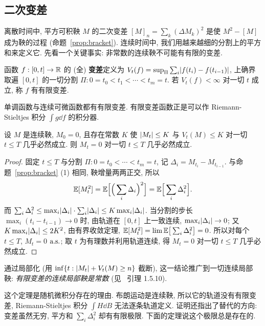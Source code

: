 \subsection{二次变差}

离散时间中, 平方可积鞅 $M$ 的二次变差 $[M]_n=\sum_k(\Delta M_k)^2$ 是使 $M^2-[M]$ 成为鞅的过程 (命题~\ref{prop:bracket}). 连续时间中, 我们用越来越细的分割上的平方和来定义它. 先看一个关键事实: 非常数的连续鞅不可能有有限的变差.

\begin{definition}[变差]
函数 $f:[0,t]\to\mathbb{R}$ 的 (全) \textbf{变差}定义为 $V_t(f)=\sup_\Pi\sum_i\lvert f(t_i)-f(t_{i-1})\rvert$, 上确界取遍 $[0,t]$ 的一切分割 $\Pi: 0=t_0<t_1<\cdots<t_m=t$. 若 $V_t(f)<\infty$ 对一切 $t$ 成立, 称 $f$ 有有限变差.
\end{definition}

单调函数与连续可微函数都有有限变差. 有限变差函数正是可以作 Riemann-Stieltjes 积分 $\int g\dd f$ 的积分器.

\begin{theorem}[连续鞅没有有限变差]\label{thm:no-finite-variation}
设 $M$ 是连续鞅, $M_0=0$, 且存在常数 $K$ 使 $\lvert M_t\rvert\le K$ 与 $V_t(M)\le K$ 对一切 $t\le T$ 几乎必然成立. 则 $M_t=0$ 对一切 $t\le T$ 几乎必然成立.
\end{theorem}

\begin{proof}
固定 $t\le T$ 与分割 $\Pi: 0=t_0<\cdots<t_m=t$, 记 $\Delta_i=M_{t_i}-M_{t_{i-1}}$. 与命题~\ref{prop:bracket} (1) 相同, 鞅增量两两正交, 所以
\[
\mathbb{E}[M_t^2]=\mathbb{E}\Big[\Big(\sum_i\Delta_i\Big)^2\Big]=\mathbb{E}\Big[\sum_i\Delta_i^2\Big].
\]
而 $\sum_i\Delta_i^2\le\max_i\lvert\Delta_i\rvert\cdot\sum_i\lvert\Delta_i\rvert\le K\max_i\lvert\Delta_i\rvert$. 当分割的步长 $\max_i(t_i-t_{i-1})\to0$ 时, 由轨道在 $[0,t]$ 上一致连续, $\max_i\lvert\Delta_i\rvert\to0$; 又 $K\max_i\lvert\Delta_i\rvert\le2K^2$, 由有界收敛定理, $\mathbb{E}[M_t^2]=\lim\mathbb{E}\big[\sum_i\Delta_i^2\big]=0$. 所以对每个 $t\le T$, $M_t=0$ $\text{a.s.}$; 取 $t$ 为有理数并利用轨道连续, 得 $M_t=0$ 对一切 $t\le T$ 几乎必然成立.
\end{proof}

通过局部化 (用 $\inf\{t: \lvert M_t\rvert+V_t(M)\ge n\}$ 截断), 这一结论推广到一切连续局部鞅: \emph{有限变差的连续局部鞅是常数} (见~\cite{karatzas} 引理 1.5.10).

\begin{intuition}
这个定理是随机微积分存在的理由. 布朗运动是连续鞅, 所以它的轨道没有有限变差, Riemann-Stieltjes 积分 $\int H\dd B$ 无法逐条轨道定义. 证明还指出了替代的方向: 变差虽然无穷, 平方和 $\sum_i\Delta_i^2$ 却有有限极限. 下面的定理说这个极限总是存在的.
\end{intuition}

